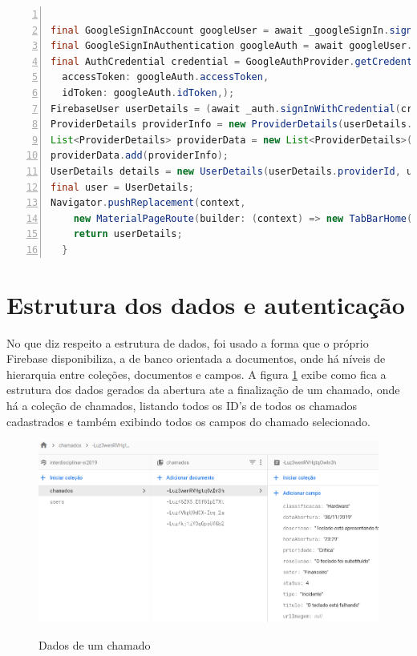 \begin{lstlisting}[numbers=left, language=Java, style=mycode, caption={Trecho de Código do método de login}, label={lst:signin-code}]

final GoogleSignInAccount googleUser = await _googleSignIn.signIn();
final GoogleSignInAuthentication googleAuth = await googleUser.authentication;
final AuthCredential credential = GoogleAuthProvider.getCredential(
  accessToken: googleAuth.accessToken,
  idToken: googleAuth.idToken,);
FirebaseUser userDetails = (await _auth.signInWithCredential(credential));
ProviderDetails providerInfo = new ProviderDetails(userDetails.providerId);
List<ProviderDetails> providerData = new List<ProviderDetails>();
providerData.add(providerInfo);
UserDetails details = new UserDetails(userDetails.providerId, userDetails.displayName, userDetails.photoUrl,userDetails.email,providerData,);
final user = UserDetails;
Navigator.pushReplacement(context,
    new MaterialPageRoute(builder: (context) => new TabBarHome(),),);
    return userDetails;
  }
\end{lstlisting}
\justifying\setlength{\parindent}{1,25cm} 

\newpage
\section{Estrutura dos dados e autenticação}
No que diz respeito a estrutura de dados, foi usado a forma que o próprio Firebase disponibiliza, a de banco orientada a documentos, onde há níveis de hierarquia entre coleções, documentos e campos. A figura \ref{fig:firestore1} exibe como fica a estrutura dos dados gerados da abertura ate a finalização de um chamado, onde há a coleção de chamados, listando todos os ID's de todos os chamados cadastrados e também exibindo todos os campos do chamado selecionado.

    \begin{figure}[htb]
        \caption{Dados de um chamado}
        \centering
        \begin{frame}{
        \includegraphics [scale = 0.44]{img/firestore1.png}}
        \end{frame}
        \label{fig:firestore1}
    \end{figure}

